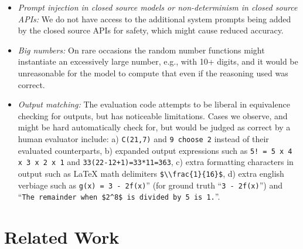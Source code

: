 \documentclass[11pt,a4paper]{article}
\begin{document}
\begin{itemize}
  \item {\em Prompt injection in closed source models or non-determinism in
    closed source APIs:} We do not have access to the additional system prompts being
    added by the closed source APIs for safety, which might cause reduced accuracy.

  \item {\em Big numbers:} On rare occasions the random number functions might
    instantiate an excessively large number, e.g., with 10+ digits, and it would be unreasonable for the model
    to compute that even if the reasoning used was correct.

  \item {\em Output matching:} The evaluation code attempts to be liberal in equivalence
    checking for outputs, but has noticeable limitations. Cases we observe, and
    might be hard automatically check for, but would be judged as correct by a
    human evaluator include: a) \verb|C(21,7)| and \verb|9 choose 2| instead of
    their evaluated counterparts, b) expanded output expressions such as
    \verb|5! = 5 x 4 x 3 x 2 x 1| and \verb|33(22-12+1)=33*11=363|, c)
    extra formatting characters in output such as LaTeX math delimiters
    \verb|$\\frac{1}{16}$|,
    d) extra english verbiage such as
    \verb|g(x) = 3 - 2f(x)|'' (for ground truth ``\verb|3 - 2f(x)|'') and\\
    ``\verb|The remainder when $2^8$ is divided by 5 is 1.|''.

\end{itemize}

\section{Related Work}
\end{document}
